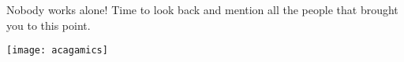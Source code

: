 \documentclass[thesis.tex]{subfiles}
\begin{document}
\label{chap:Acknowledgments}

Nobody works alone! Time to look back and mention all the people that brought you to this point.

\begin{figure*}
\centering
\texttt{[image: acagamics]}
\end{figure*}

\newpage
\end{document}
